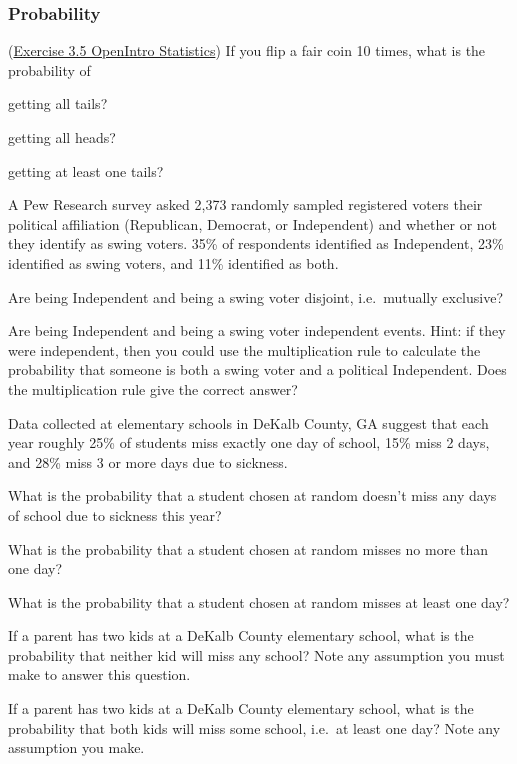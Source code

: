 \documentclass[12pt]{exam}
\newcounter{countA}
\begin{document}
\subsubsection*{Probability}\label{probability}
\begin{questions}
\setcounter{question}{\value{countA}}
\question (\href{https://people.hsc.edu/faculty-staff/blins/books/OpenIntroStats4e.pdf#eoce.3.5}{Exercise 3.5 OpenIntro Statistics})
  If you flip a fair coin 10 times, what is the probability of

  \begin{parts}
  \item
    getting all tails?
\vfill
  \item
    getting all heads?
\vfill
  \item
    getting at least one tails?
\vfill
  \end{parts}
\question
  A Pew Research survey asked 2,373 randomly sampled registered voters
  their political affiliation (Republican, Democrat, or Independent) and
  whether or not they identify as swing voters. 35\% of respondents
  identified as Independent, 23\% identified as swing voters, and 11\%
  identified as both.

  \begin{parts}
  \item
    Are being Independent and being a swing voter disjoint,
    i.e.~mutually exclusive?
\vfill
  \item
    Are being Independent and being a swing voter independent events.
    Hint: if they were independent, then you could use the
    multiplication rule to calculate the probability that someone is
    both a swing voter and a political Independent. Does the
    multiplication rule give the correct answer?
\vfill
  \end{parts}
\question
  Data collected at elementary schools in DeKalb County, GA suggest that
  each year roughly 25\% of students miss exactly one day of school,
  15\% miss 2 days, and 28\% miss 3 or more days due to sickness.

  \begin{parts}
  \item
    What is the probability that a student chosen at random doesn't miss
    any days of school due to sickness this year?
\vfill
  \item
    What is the probability that a student chosen at random misses no
    more than one day?
\vfill
  \item
    What is the probability that a student chosen at random misses at
    least one day?
\newpage
  \item
    If a parent has two kids at a DeKalb County elementary school, what
    is the probability that neither kid will miss any school? Note any
    assumption you must make to answer this question.
\vfill
  \item
    If a parent has two kids at a DeKalb County elementary school, what
    is the probability that both kids will miss some school, i.e.~at
    least one day? Note any assumption you make.
\vfill
  \end{parts}

\setcounter{countA}{\value{question}}
\end{questions}
\end{document}

